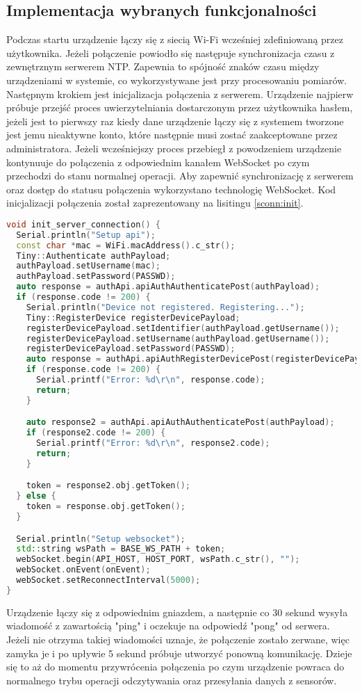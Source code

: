 \subsection{Implementacja wybranych funkcjonalności}
Podczas startu urządzenie łączy się z siecią Wi-Fi wcześniej zdefiniowaną przez użytkownika.
Jeżeli połączenie powiodło się następuje synchronizacja czasu z zewnętrznym serwerem NTP.
Zapewnia to spójność znaków czasu między urządzeniami w systemie, co wykorzystywane jest
przy procesowaniu pomiarów. Następnym krokiem jest inicjalizacja połączenia z serwerem.
Urządzenie najpierw próbuje przejść proces uwierzytelniania dostarczonym przez użytkownika
hasłem, jeżeli jest to pierwszy raz kiedy dane urządzenie łączy się z systemem tworzone jest
jemu nieaktywne konto, które następnie musi zostać zaakceptowane przez administratora.
Jeżeli wcześniejszy proces przebiegł z powodzeniem urządzenie kontynuuje do połączenia
z odpowiednim kanałem WebSocket po czym przechodzi do stanu normalnej operacji.
Aby zapewnić synchronizację z serwerem oraz dostęp do statusu połączenia wykorzystano
technologię WebSocket. Kod inicjalizacji połączenia został zaprezentowany na lisitingu
\ref{sconn:init}.
\begin{lstlisting}[language={C++},caption={Utworzenie konta i połączenie z serwerem},label={sconn:init},captionpos=b]
void init_server_connection() {
  Serial.println("Setup api");
  const char *mac = WiFi.macAddress().c_str();
  Tiny::Authenticate authPayload;
  authPayload.setUsername(mac);
  authPayload.setPassword(PASSWD);
  auto response = authApi.apiAuthAuthenticatePost(authPayload);
  if (response.code != 200) {
    Serial.println("Device not registered. Registering...");
    Tiny::RegisterDevice registerDevicePayload;
    registerDevicePayload.setIdentifier(authPayload.getUsername());
    registerDevicePayload.setUsername(authPayload.getUsername());
    registerDevicePayload.setPassword(PASSWD);
    auto response = authApi.apiAuthRegisterDevicePost(registerDevicePayload);
    if (response.code != 200) {
      Serial.printf("Error: %d\r\n", response.code);
      return;
    }

    auto response2 = authApi.apiAuthAuthenticatePost(authPayload);
    if (response2.code != 200) {
      Serial.printf("Error: %d\r\n", response2.code);
      return;
    }

    token = response2.obj.getToken();
  } else {
    token = response.obj.getToken();
  }

  Serial.println("Setup websocket");
  std::string wsPath = BASE_WS_PATH + token;
  webSocket.begin(API_HOST, HOST_PORT, wsPath.c_str(), "");
  webSocket.onEvent(onEvent);
  webSocket.setReconnectInterval(5000);
}
\end{lstlisting}
Urządzenie łączy się z odpowiednim gniazdem, a następnie co 30
sekund wysyła wiadomość z zawartością "ping" i oczekuje na odpowiedź "pong" od serwera.
Jeżeli nie otrzyma takiej wiadomości uznaje, że połączenie zostało zerwane, więc zamyka je
i po upływie 5 sekund próbuje utworzyć ponowną komunikację. Dzieje się to aż do momentu przywrócenia
połączenia po czym urządzenie powraca do normalnego trybu operacji odczytywania oraz
przesyłania danych z sensorów.

